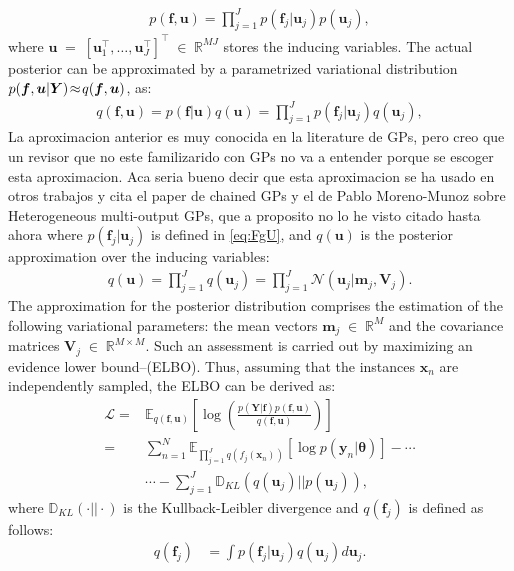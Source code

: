 \documentclass[journal]{IEEEtran}
\providecommand{\ve}[1]{{\bm{#1}}}%
\providecommand{\mat}[1]{{\bm{#1}}} %
\newcommand{\Real}{\mathbb{R}}
\DeclareMathOperator{\en}{\!\,\in\!\,}
\DeclareMathOperator{\igual}{\!\,=\!\,}
\providecommand{\s}[1]{\negthinspace#1\negthinspace}%
\providecommand{\ve}[1]{{\mathbf{#1}}}
\providecommand{\mat}[1]{{\mathbf{#1}}}
\newcommand{\gauss}{\mathcal{N}} %
\newcommand{\comment}[2]{{\color{blue}#1} {\color{red}#2}}
\begin{document}
\begin{align}
\label{eq:CGPpri}
p({\ve{f}}, {\ve{u}}) = \prod_{j=1}^{J}p(\ve{f}_j|\ve{u}_j)p(\ve{u}_j),
\end{align}
where ${\ve{u}}\igual \left[\ve{u}_1^{\top},\dots, \ve{u}_J^{\top}\right]^{\top}\en \Real^{MJ}$ stores the inducing variables. The actual posterior can be approximated by a parametrized variational distribution $p({\ve{f}},{\ve{u}}|\mat{Y})\s{\approx} q({\ve{f}},{\ve{u}})$, as:
\begin{align}
q({\ve{f}},{\ve{u}}) = p({\ve{f}}|{\ve{u}})q({\ve{u}})= \prod_{j=1}^{J}p(\ve{f}_j|\ve{u}_j)q(\ve{u}_j),
\end{align}
\comment{}{La aproximacion anterior es muy conocida en la literature de GPs, pero creo que un revisor que no este familizarido con GPs no va a entender porque se escoger esta aproximacion. Aca seria bueno decir que esta aproximacion se ha usado en otros trabajos y cita el paper de chained GPs y el de Pablo Moreno-Munoz sobre Heterogeneous multi-output GPs, que a proposito no lo he visto citado hasta ahora}
where $p(\ve{f}_j|\ve{u}_j)$ is defined in \cref{eq:FgU}, and $q({\ve{u}})$ is the posterior approximation over the inducing variables:
\begin{align}
\label{eq:QU}
q({\ve{u}}) = \prod_{j=1}^{J}q(\ve{u}_j)=\prod_{j=1}^{J}\gauss\left(\ve{u}_j|\ve{m}_j,\mat{V}_j\right).
\end{align}
The approximation for the posterior distribution comprises the estimation of the following variational parameters: the mean vectors $\ve{m}_j\en \Real^{M}$ and the covariance matrices $\mat{V}_j\en \Real^{M\times M}$. Such an assessment is carried out by maximizing an evidence lower bound--(ELBO). Thus, assuming that the instances $\ve{x}_n$ are independently sampled, the ELBO can be derived as:
\begin{align}
\label{eq:LowBound}
\mathcal{L}=&\mathbb{E}_{q({\ve{f}},{\ve{u}})}\left[\log\left( \frac{p(\mat{Y}|{\ve{f}})p({\ve{f}},{\ve{u}})}{q({\ve{f}},{\ve{u}})}\right)\right]\\
=&\sum_{n=1}^{N}\mathbb{E}_{\prod\limits^J_{j=1}q(f_j(\ve{x}_n))}\left[\log p\left(\ve{y}_n|\bm{\theta}\right)\right]-\cdots\nonumber\\
&\cdots-\sum_{j=1}^{J} \mathbb{D}_{KL}(q(\ve{u}_j)||p(\ve{u}_j))\label{eq:LowBound21},
\end{align}
where $\mathbb{D}_{KL}(\cdot||\cdot)$ is the Kullback-Leibler divergence and $q(\ve{f}_j)$ is defined as follows:
\begin{align}
q(\ve{f}_j) &= \int p(\ve{f}_j|\ve{u}_j)q(\ve{u}_j)d\ve{u}_j.
\label{eq:PostVar}
\end{align}
\end{document}
